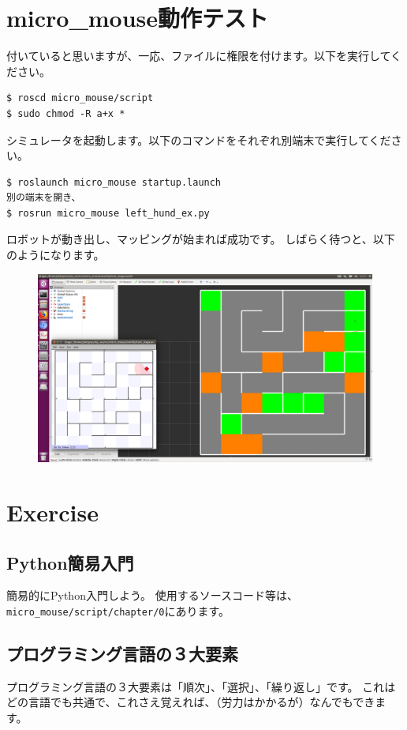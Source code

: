 \documentclass[11pt,a4paper]{jsarticle}
\begin{document}
\section{micro\_mouse動作テスト}
付いていると思いますが、一応、ファイルに権限を付けます。以下を実行してください。
\begin{lstlisting}[frame=single, caption=roscd, label=roscd]
$ roscd micro_mouse/script
$ sudo chmod -R a+x *
\end{lstlisting}

シミュレータを起動します。以下のコマンドをそれぞれ別端末で実行してください。
\begin{lstlisting}[frame=single, caption=roscd, label=roscd]
$ roslaunch micro_mouse startup.launch
別の端末を開き、
$ rosrun micro_mouse left_hund_ex.py
\end{lstlisting}


ロボットが動き出し、マッピングが始まれば成功です。
しばらく待つと、以下のようになります。
\begin{figure}[h]
  \begin{center}
    \includegraphics[width=128mm]{./mms_test.png}
  \end{center}
  \caption{}
  \label{test}
\end{figure}




\section{Exercise}
\subsection{Python簡易入門}
簡易的にPython入門しよう。
使用するソースコード等は、\verb|micro_mouse/script/chapter/0|にあります。

\subsection{プログラミング言語の３大要素}
プログラミング言語の３大要素は「順次」、「選択」、「繰り返し」です。
これはどの言語でも共通で、これさえ覚えれば、（労力はかかるが）なんでもできます。\\
\end{document}
